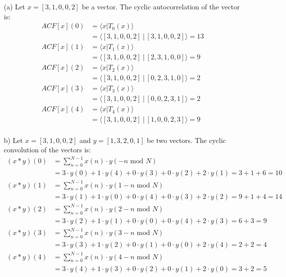 \documentclass[12pt]{article}
\begin{document}
\begin{itemize}
    \item[(a)]
    Let $x=[3,1,0,0,2]$ be a vector. The cyclic autocorrelation of the vector is:
    \begin{align*}
        ACF[x](0) &= \langle x | T_0(x) \rangle \\
        &= \langle [3,1,0,0,2] ~|~ [3,1,0,0,2] \rangle = 13\\
        ACF[x](1) &= \langle x | T_1(x) \rangle \\
        &= \langle [3,1,0,0,2] ~|~ [2,3,1,0,0] \rangle = 9\\
         ACF[x](2) &= \langle x | T_2(x) \rangle \\
        &= \langle [3,1,0,0,2] ~|~ [0,2,3,1,0] \rangle = 2\\
        ACF[x](3) &= \langle x | T_3(x) \rangle \\
        &= \langle [3,1,0,0,2] ~|~ [0,0,2,3,1] \rangle = 2\\
        ACF[x](4) &= \langle x | T_4(x) \rangle \\
        &= \langle [3,1,0,0,2] ~|~ [1,0,0,2,3] \rangle = 9\\
    \end{align*}

    \item[b)]
    Let $x = [3,1,0,0,2]$ and $y=[1,3,2,0,1]$ be two vectors. The cyclic convolution of the vectors is:
    \begin{align*}
        (x*y)(0) &= \sum_{n=0}^{N-1}x(n) \cdot y(-n \text{ mod } N)\\
        &= 3 \cdot y(0) + 1 \cdot y(4) + 0 \cdot y(3) + 0 \cdot y(2) + 2 \cdot y(1) = 3 + 1 + 6 = 10\\
        (x*y)(1) &= \sum_{n=0}^{N-1}x(n) \cdot y(1-n \text{ mod } N)\\
        &= 3 \cdot y(1) + 1 \cdot y(0) + 0 \cdot y(4) + 0 \cdot y(3) + 2 \cdot y(2) = 9 + 1 + 4 = 14\\
        (x*y)(2) &= \sum_{n=0}^{N-1}x(n) \cdot y(2-n \text{ mod } N)\\
        &= 3 \cdot y(2) + 1 \cdot y(1) + 0 \cdot y(0) + 0 \cdot y(4) + 2 \cdot y(3) = 6 + 3 = 9\\
        (x*y)(3) &= \sum_{n=0}^{N-1}x(n) \cdot y(3-n \text{ mod } N)\\
        &= 3 \cdot y(3) + 1 \cdot y(2) + 0 \cdot y(1) + 0 \cdot y(0) + 2 \cdot y(4) = 2 + 2 = 4\\
        (x*y)(4) &= \sum_{n=0}^{N-1}x(n) \cdot y(4-n \text{ mod } N)\\
        &= 3 \cdot y(4) + 1 \cdot y(3) + 0 \cdot y(2) + 0 \cdot y(1) + 2 \cdot y(0) = 3 + 2 = 5
    \end{align*}
\end{itemize}
\end{document}
